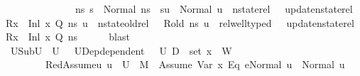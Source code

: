 \begin{isabellebody}
\ \ \ \ \ \ \ \ \ \ \ \ \ \ {\isacharparenleft}{\kern0pt}{\isasymforall}ns{\isacharprime}{\kern0pt}{\isachardot}{\kern0pt}\ s{\isacharprime}{\kern0pt}\ {\isacharequal}{\kern0pt}\ Normal\ ns{\isacharprime}{\kern0pt}\ {\isasymlongrightarrow}\ su\ {\isacharequal}{\kern0pt}\ Normal\ u\ {\isasymand}\ nstate{\isacharunderscore}{\kern0pt}rel\ {\isasymLambda}\ {\isasymLambda}{\isacharprime}{\kern0pt}\ {\isacharparenleft}{\kern0pt}update{\isacharunderscore}{\kern0pt}nstate{\isacharunderscore}{\kern0pt}rel\ {\isacharparenleft}{\kern0pt}R{\isacharparenleft}{\kern0pt}x{}\ {\isasymmapsto}\ {\isacharparenleft}{\kern0pt}Inl\ x{}{\isacharparenright}{\kern0pt}{\isacharparenright}{\kern0pt}{\isacharparenright}{\kern0pt}\ Q{\isacharparenright}{\kern0pt}\ ns{\isacharprime}{\kern0pt}\ u\ {\isasymand}\ nstate{\isacharunderscore}{\kern0pt}old{\isacharunderscore}{\kern0pt}rel\ {\isasymLambda}\ {\isasymLambda}{\isacharprime}{\kern0pt}\ R{\isacharunderscore}{\kern0pt}old\ ns{\isacharprime}{\kern0pt}\ u\ {\isasymand}\ rel{\isacharunderscore}{\kern0pt}well{\isacharunderscore}{\kern0pt}typed\ {\isasymLambda}\ {\isasymOmega}\ {\isacharparenleft}{\kern0pt}update{\isacharunderscore}{\kern0pt}nstate{\isacharunderscore}{\kern0pt}rel\ {\isacharparenleft}{\kern0pt}R{\isacharparenleft}{\kern0pt}x{}\ {\isasymmapsto}\ {\isacharparenleft}{\kern0pt}Inl\ x{}{\isacharparenright}{\kern0pt}{\isacharparenright}{\kern0pt}{\isacharparenright}{\kern0pt}\ Q{\isacharparenright}{\kern0pt}\ ns{\isacharprime}{\kern0pt}{\isacharparenright}{\kern0pt}{\isacharparenright}{\kern0pt}{\isachardoublequoteclose}\isanewline
\ \ \ \ \isamarkupfalse%
\ blast\isanewline
\ \ \isamarkupfalse%
\ U{}Sub{\isacharprime}{\kern0pt}{\isacharcolon}{\kern0pt}{\isachardoublequoteopen}U{}\ {\isasymsubseteq}\ U{}{\isachardoublequoteclose}\ \ \ U{}Dep{\isacharprime}{\kern0pt}{\isacharcolon}{\kern0pt}{\isachardoublequoteopen}dependent\ {\isasymLambda}{\isacharprime}{\kern0pt}\ {\isasymOmega}\ U{}\ {\isacharparenleft}{\kern0pt}D{}\ {\isasymunion}\ set\ {\isacharparenleft}{\kern0pt}x{}\ {\isacharhash}{\kern0pt}\ W{\isacharparenright}{\kern0pt}{\isacharparenright}{\kern0pt}{\isachardoublequoteclose}\ \ \isanewline
\ \ \ \ \ \ \ \ RedAssume{}{\isacharcolon}{\kern0pt}{\isachardoublequoteopen}{\isasymAnd}u{\isachardot}{\kern0pt}\ u\ {\isasymin}\ U{}\ {\isasymLongrightarrow}\ M{\isacharcomma}{\kern0pt}{\isasymLambda}{\isacharprime}{\kern0pt}{\isacharcomma}{\kern0pt}{\isasymGamma}{\isacharcomma}{\kern0pt}{\isasymOmega}\ {\isasymturnstile}\ {\isasymlangle}Assume\ {\isacharparenleft}{\kern0pt}{\isacharparenleft}{\kern0pt}Var\ x{}{\isacharparenright}{\kern0pt}\ {\isasymguillemotleft}Eq{\isasymguillemotright}\ e{}{\isacharparenright}{\kern0pt}{\isacharcomma}{\kern0pt}Normal\ u{\isasymrangle}\ {\isasymrightarrow}\ Normal\ u{\isachardoublequoteclose}\ \isamarkupfalse%

\end{isabellebody}
